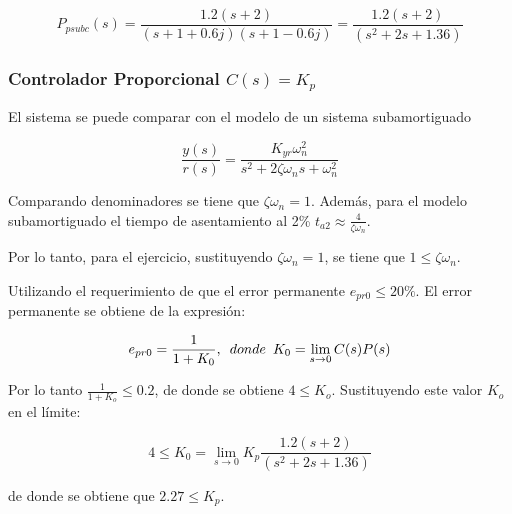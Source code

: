 \documentclass{report}
\begin{document}
\begin{equation}
    P_{psubc}(s) = \frac{1.2(s+2)}{(s+1+0.6 j)(s+1-0.6 j)} = \frac{1.2(s+2)}{(s^2+2s+1.36)} 
\label{Eq:5}
\end{equation}

\subsubsection{Controlador Proporcional $C(s) = K_p$}
El sistema se puede comparar con el modelo de un sistema subamortiguado 

\begin{equation}
    \frac{y(s)}{r(s)}=\frac{K_{yr}\omega_n^2}{s^2+2\zeta \omega_ns+\omega_n^2}
\label{Eq:6}
\end{equation}

Comparando denominadores se tiene que $\zeta \omega_n = 1$. Además, para el modelo subamortiguado el tiempo de asentamiento al 2\% $t_{a2} \approx \frac{4}{\zeta \omega_n}$.

Por lo tanto, para el ejercicio, sustituyendo $\zeta \omega_n = 1$, se tiene que $1 \leqslant \zeta \omega_n$.

Utilizando el requerimiento de que el error permanente $e_{pr0} \leqslant 20\%$. El error permanente se obtiene de la expresión:

\begin{equation}
    e_{pr0} = \frac{1}{1+K_0},\enskip donde \enskip K_0 = \lim_{s\to0} C(s)P(s) 
\end{equation}

Por lo tanto $\frac{1}{1+K_o} \leqslant 0.2$, de donde se obtiene $4 \leqslant K_o$. Sustituyendo este valor $K_o$ en el límite:

\begin{equation}
    4 \leqslant K_0 = \lim_{s\to0} K_p\frac{1.2(s+2)}{(s^2+2s+1.36)} 
\end{equation}

de donde se obtiene que $2.27 \leqslant K_p$. 
\end{document}
